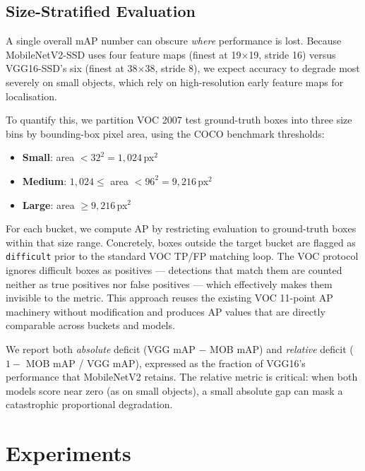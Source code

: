 \documentclass{article}
\begin{document}
\subsection{Size-Stratified Evaluation}

\qquad A single overall mAP number can obscure \emph{where} performance is lost. Because MobileNetV2-SSD uses four feature maps (finest at 19$\times$19, stride 16) versus VGG16-SSD's six (finest at 38$\times$38, stride 8), we expect accuracy to degrade most severely on small objects, which rely on high-resolution early feature maps for localisation.

\qquad To quantify this, we partition VOC 2007 test ground-truth boxes into three size bins by bounding-box pixel area, using the COCO benchmark thresholds:
\begin{itemize}
  \item \textbf{Small}: area $< 32^2 = 1{,}024$\,px$^2$
  \item \textbf{Medium}: $1{,}024 \leq$ area $< 96^2 = 9{,}216$\,px$^2$
  \item \textbf{Large}: area $\geq 9{,}216$\,px$^2$
\end{itemize}

\qquad For each bucket, we compute AP by restricting evaluation to ground-truth boxes within that size range. Concretely, boxes outside the target bucket are flagged as \texttt{difficult} prior to the standard VOC TP/FP matching loop. The VOC protocol ignores difficult boxes as positives — detections that match them are counted neither as true positives nor false positives — which effectively makes them invisible to the metric. This approach reuses the existing VOC 11-point AP machinery without modification and produces AP values that are directly comparable across buckets and models.

\qquad We report both \emph{absolute} deficit (VGG mAP $-$ MOB mAP) and \emph{relative} deficit ($1 -$ MOB mAP / VGG mAP), expressed as the fraction of VGG16's performance that MobileNetV2 retains. The relative metric is critical: when both models score near zero (as on small objects), a small absolute gap can mask a catastrophic proportional degradation.

\section{Experiments}
\label{sec:experiments}
\end{document}
